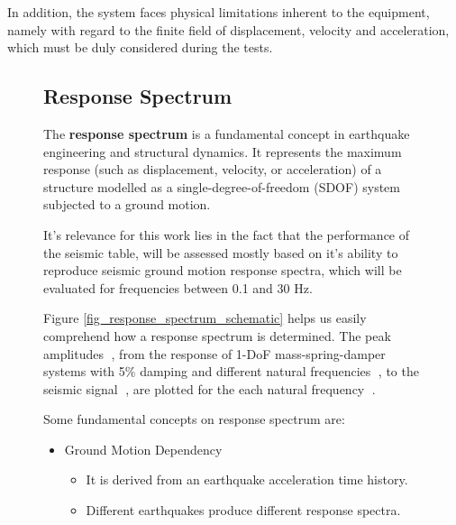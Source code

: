 \documentclass[10pt]{extarticle}
\begin{document}
In addition, the system faces physical limitations inherent to the equipment, namely with regard to the finite field of displacement, velocity and acceleration, which must be duly considered during the tests.

\begin{figure}[H]
\begin{minipage}{0.6\textwidth}
\setlength{\parindent}{2pt}
\subsection{Response Spectrum}%

\hspace*{\parindent} The \textbf{response spectrum} is a fundamental concept in earthquake engineering and structural dynamics. It represents the maximum response (such as displacement, velocity, or acceleration) of a structure modelled as a single-degree-of-freedom (SDOF) system subjected to a ground motion. 

It's relevance for this work lies in the fact that the performance of the seismic table, will be assessed mostly based on it's ability to reproduce seismic ground motion response spectra, which will be evaluated for frequencies between 0.1 and 30 Hz.

\vspace{5mm}

\hspace*{\parindent} Figure \ref{fig_response_spectrum_schematic} helps us easily comprehend how a response spectrum is determined.  The peak amplitudes {\textcircled{}}, from the response of  1-DoF mass-spring-damper systems with 5\% damping and different natural frequencies {\textcircled{}}, to the seismic signal {\textcircled{}}, are plotted for the each natural frequency {\textcircled{}}.

\vspace{5mm}

\hspace*{\parindent} Some fundamental concepts on response spectrum are:
\begin{itemize}[noitemsep, topsep=0pt, leftmargin=*]
    \item Ground Motion Dependency
    \begin{itemize}[noitemsep, topsep=0pt, leftmargin=*]
        \item It is derived from an earthquake acceleration time history.
        \item Different earthquakes produce different response spectra.
    \end{itemize}
    

\end{itemize}
\end{minipage}
\end{figure}
\end{document}
